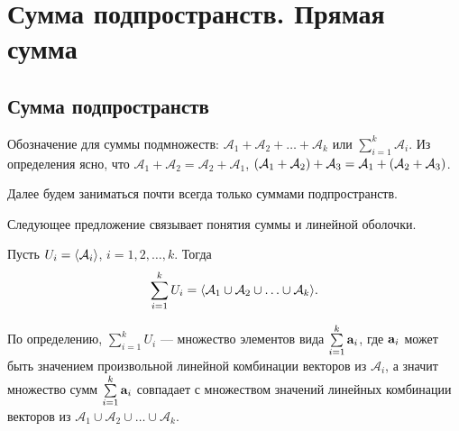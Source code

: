 \section{Сумма подпространств. Прямая сумма %
}

\subsection{Сумма подпространств}


Обозначение для суммы подмножеств: $\mathcal{A}_1+ \mathcal{A}_2+ \ldots +\mathcal{A}_k$
или $\sum\limits_{i=1}^{k} \mathcal{A}_i$.
Из определения ясно, что $\mathcal{A}_1+ \mathcal{A}_2 = \mathcal{A}_2+ \mathcal{A}_1$,
$(\mathcal{A}_1+ \mathcal{A}_2)+ \mathcal{A}_3 \hm= \mathcal{A}_1+ (\mathcal{A}_2+ \mathcal{A}_3)$.


Далее будем заниматься почти всегда только суммами подпространств.


Следующее предложение связывает понятия суммы и линейной оболочки.

\begin{predl}\label{p7_4_2}
Пусть $U_i = \langle \mathcal{A}_i \rangle$, $i=1, 2, \ldots , k$.
Тогда
$$\sum\limits_{i=1}^k U_i=
\langle \mathcal{A}_1 \cup \mathcal{A}_2 \cup \ldots \cup \mathcal{A}_k \rangle.$$
\end{predl}
\dok По определению, $\sum\limits_{i=1}^k U_i$ --- множество элементов вида $\sum\limits_{i=1}^k \mathbf{a}_i$, где $\mathbf{a}_i$ может быть значением произвольной линейной комбинации векторов из $\mathcal{A}_i$, а значит множество сумм $\sum\limits_{i=1}^k \mathbf{a}_i$ совпадает с множеством значений линейных комбинации векторов из 
$\mathcal{A}_1 \cup \mathcal{A}_2 \cup \ldots \cup \mathcal{A}_k$.
\edok

\otstup

